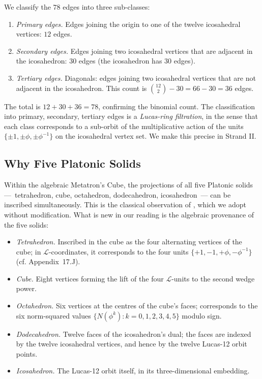 We classify the $78$ edges into three sub-classes:

\begin{enumerate}
\item \emph{Primary edges.} Edges joining the origin to one of the
  twelve icosahedral vertices: $12$ edges.
\item \emph{Secondary edges.} Edges joining two icosahedral
  vertices that are adjacent in the icosahedron: $30$ edges
  (the icosahedron has $30$ edges).
\item \emph{Tertiary edges.} Diagonals: edges joining two
  icosahedral vertices that are not adjacent in the icosahedron.
  This count is $\binom{12}{2} - 30 = 66 - 30 = 36$ edges.
\end{enumerate}

The total is $12 + 30 + 36 = 78$, confirming the binomial count.
The classification into primary, secondary, tertiary edges is a
\emph{Lucas-ring filtration}, in the sense that each class
corresponds to a sub-orbit of the multiplicative action of the
units $\{\pm 1, \pm \phi, \pm \phi^{-1}\}$ on the icosahedral
vertex set. We make this precise in Strand II.

\subsection{Why Five Platonic Solids}
\label{sec:13-five-platonic}

Within the algebraic Metatron's Cube, the projections of all five
Platonic solids ---~tetrahedron, cube, octahedron, dodecahedron,
icosahedron~--- can be inscribed simultaneously. This is the
classical observation of \cite{coxeter1973regular}, which we adopt
without modification. What is new in our reading is the algebraic
provenance of the five solids:

\begin{itemize}
\item \emph{Tetrahedron.} Inscribed in the cube as the four
  alternating vertices of the cube; in $\mathcal{L}$-coordinates,
  it corresponds to the four units $\{+1, -1, +\phi, -\phi^{-1}\}$
  (cf. Appendix~17.J).
\item \emph{Cube.} Eight vertices forming the lift of the four
  $\mathcal{L}$-units to the second wedge power.
\item \emph{Octahedron.} Six vertices at the centres of the cube's
  faces; corresponds to the six norm-squared values
  $\{N(\phi^{k}) : k = 0, 1, 2, 3, 4, 5\}$ modulo sign.
\item \emph{Dodecahedron.} Twelve faces of the icosahedron's dual;
  the faces are indexed by the twelve icosahedral vertices, and
  hence by the twelve Lucas-12 orbit points.
\item \emph{Icosahedron.} The Lucas-12 orbit itself, in its
  three-dimensional embedding.
\end{itemize}

